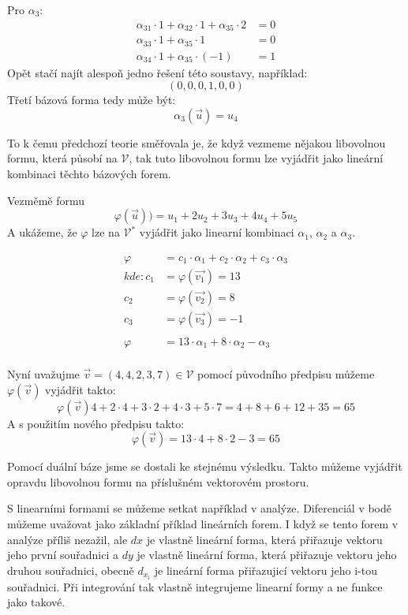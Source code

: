 \begin{example}
    Pro $\alpha_3$:
    \begin{align*}
        \alpha_{31} \cdot 1 + \alpha_{32} \cdot 1 + \alpha_{35} \cdot 2 &= 0\\
        \alpha_{33} \cdot 1 + \alpha_{35} \cdot 1 &= 0\\
        \alpha_{34} \cdot 1 + \alpha_{35} \cdot (-1) &= 1
    \end{align*}
    Opět stačí najít alespoň jedno řešení této soustavy, například:
    $$(0, 0, 0, 1, 0, 0)$$
    Třetí bázová forma tedy může být:
    $$\alpha_3(\vec{u}) = u_4$$

    To k čemu předchozí teorie směřovala je, že když vezmeme nějakou libovolnou formu,
    která působí na $\mathcal{V}$, tak tuto libovolnou formu lze vyjádřit jako lineární
    kombinaci těchto bázových forem.

    Vezměmě formu
    $$\varphi(\vec{u})) = u_1 + 2u_2 + 3u_3 + 4u_4 + 5u_5$$
    A ukážeme, že $\varphi$ lze na $\mathcal{V}^*$ vyjádřit jako linearní kombinaci
    $\alpha_1$, $\alpha_2$ a $\alpha_3$.

    \begin{align*}
        \varphi &= c_1 \cdot \alpha_1 + c_2 \cdot \alpha_2 + c_3 \cdot \alpha_3\\
        kde:
        c_1 &= \varphi(\vec{v_1}) = 13\\
        c_2 &= \varphi(\vec{v_2}) = 8\\
        c_3 &= \varphi(\vec{v_3}) = -1\\
        \\
        \varphi &= 13 \cdot \alpha_1 + 8 \cdot \alpha_2 - \alpha_3\\
    \end{align*}

    Nyní uvažujme $\vec{v} = (4, 4, 2, 3, 7) \in \mathcal{V}$ pomocí původního předpisu můžeme
    $\varphi(\vec{v})$ vyjádřit takto:
    $$\varphi(\vec{v}) 4 + 2\cdot4 + 3\cdot2 + 4\cdot3 + 5\cdot7 = 4 + 8 + 6 + 12+35 = 65$$
    A s použitím nového předpisu takto:
    $$\varphi(\vec{v}) = 13 \cdot 4 + 8 \cdot 2 - 3 = 65$$

    Pomocí duální báze jsme se dostali ke stejnému výsledku. Takto můžeme vyjádřit opravdu
    libovolnou formu na příslušném vektorovém prostoru.
\end{example}

S linearními formami se můžeme setkat například v analýze. Diferenciál v bodě můžeme uvažovat
jako základní příklad lineárních forem. I když se tento  forem v analýze příliš nezažil,
ale $dx$ je vlastně lineární forma, která přiřazuje vektoru jeho první souřadnici a
$dy$ je vlastně lineární forma, která přiřazuje vektoru jeho druhou souřadnici, obecně $d_{x_i}$
je lineární forma přiřazujicí vektoru jeho i-tou souřadnici. Při integrování tak vlastně integrujeme
linearní formy a ne funkce jako takové.



